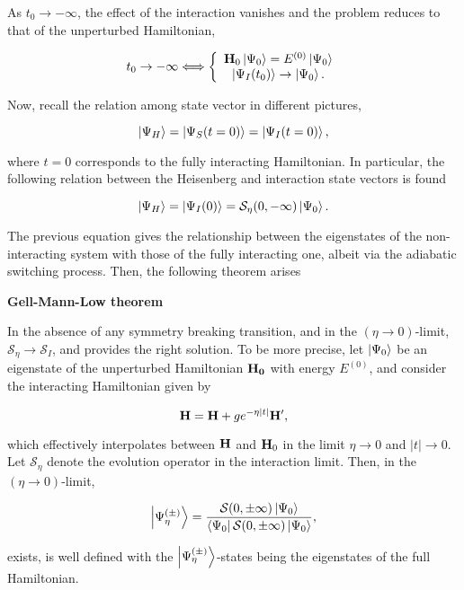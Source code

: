 As $t_0 \rightarrow - \infty$, the effect of the interaction vanishes and the problem reduces to that of the unperturbed Hamiltonian, 

$$
    t_0 \rightarrow -\infty \Longleftrightarrow \left\{\begin{array}{cc}
         {\bf H}_0 \ket{\Psi_0} = E^{(0)} \ket{\Psi_0}  \\
         \ket{\Psi_I(t_0)} \rightarrow \ket{\Psi_0}. 
    \end{array}\right.
$$

Now, recall the relation among state vector in different pictures, 

$$
    \ket{\Psi_H} = \ket{\Psi_S(t=0)} = \ket{\Psi_I (t=0)},
$$

where $t=0$ corresponds to the fully interacting Hamiltonian. In particular, the following relation between the Heisenberg and interaction state vectors is found 

$$
    \ket{\Psi_H} = \ket{\Psi_I (0)} = \mathcal{S}_{\eta}(0, - \infty) \ket{\Psi_0}. 
$$

The previous equation gives the relationship between the eigenstates of the non-interacting system with those of the fully interacting one, albeit via the adiabatic switching process. Then, the following theorem arises \\

\begin{theorem} \textbf{\textnormal{Gell-Mann-Low theorem}}

In the absence of any symmetry breaking transition, and in the $(\eta \rightarrow 0)$-limit, $\mathcal{S}_{\eta} \rightarrow \mathcal{S}_I$, and provides the right solution. To be more precise, let $\ket{\Psi_0}$ be an eigenstate of the unperturbed Hamiltonian ${\bf H_0}$ with energy $E^{(0)}$, and consider the interacting Hamiltonian given by

$$
    {\bf H} = {\bf H} + g e^{-\eta |t|} {\bf H}',
$$

which effectively interpolates between ${\bf H}$ and ${\bf H}_0$ in the limit $\eta \rightarrow 0$ and $|t|\rightarrow 0$. Let $\mathcal{S}_{\eta}$ denote the evolution operator in the interaction limit. Then, in the $(\eta \rightarrow 0)$-limit,

$$
    \ket{\Psi_{\eta}^{(\pm)}} = \frac{\mathcal{S}(0, \pm\infty) \ket{\Psi_0}}{\bra{\Psi_0} \mathcal{S}(0, \pm\infty) \ket{\Psi_0}},
$$

exists, is well defined with the $ \ket{\Psi_{\eta}^{(\pm)}}$-states being the eigenstates of the full Hamiltonian.

\end{theorem}

